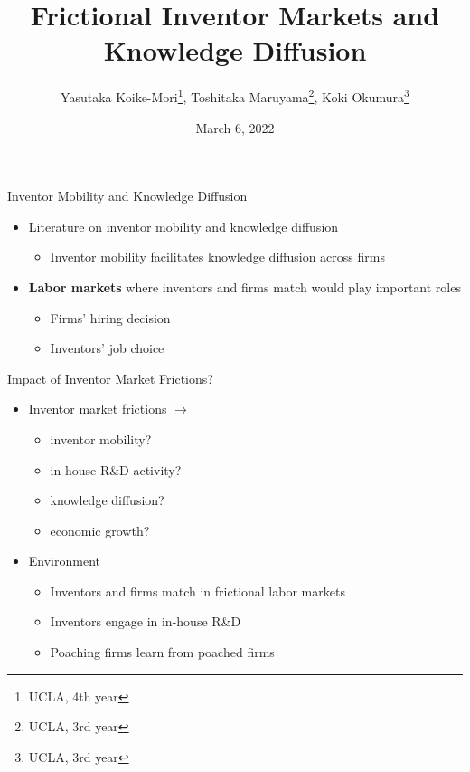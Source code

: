 \documentclass{beamer}
\title{Frictional Inventor Markets and Knowledge Diffusion}
\author{Yasutaka Koike-Mori\thanks{UCLA, 4th year}, Toshitaka Maruyama\thanks{UCLA, 3rd year}, Koki Okumura\thanks{UCLA, 3rd year}}
\date{March 6, 2022}
\begin{document}
\begin{frame}
  \titlepage
\end{frame}

\begin{frame}{Inventor Mobility and Knowledge Diffusion}
  \begin{itemize}
    \setlength\itemsep{3mm}
    \item Literature on inventor mobility and knowledge diffusion
          \begin{itemize}
            \item Inventor mobility facilitates knowledge diffusion across firms
          \end{itemize}

    \item {\bf Labor markets} where inventors and firms match would play important roles
          \begin{itemize}
            \item Firms' hiring decision
            \item Inventors' job choice
          \end{itemize}
  \end{itemize}
\end{frame}

\begin{frame}{Impact of Inventor Market Frictions?}
  \begin{itemize}
    \setlength\itemsep{3mm}
    \item Inventor market frictions $\rightarrow$ \\ \begin{itemize}
            \item inventor mobility?
            \item in-house R\&D activity?
            \item knowledge diffusion?
            \item economic growth?
          \end{itemize}
    \item Environment
          \begin{itemize}
            \item Inventors and firms match in frictional labor markets
            \item Inventors engage in in-house R\&D
            \item Poaching firms learn from poached firms
          \end{itemize}
  \end{itemize}
\end{frame}
\end{document}
